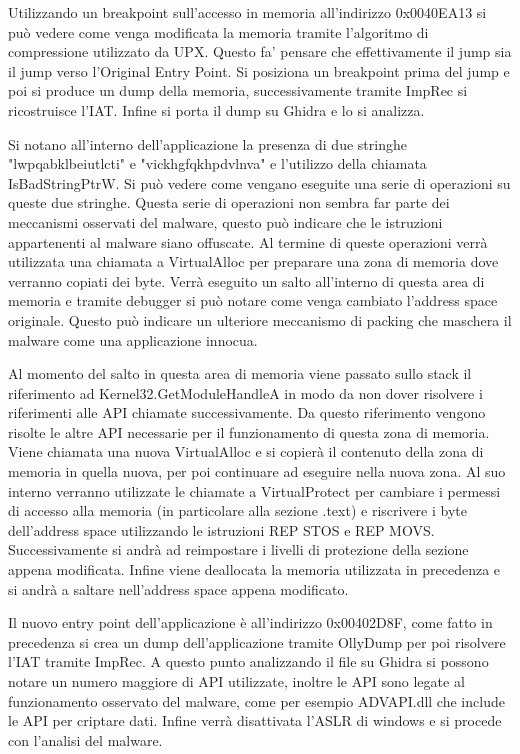 \documentclass[a4paper,12pt]{article}
\begin{document}
Utilizzando un breakpoint sull'accesso in memoria all'indirizzo 0x0040EA13 si può vedere come venga modificata la memoria tramite l'algoritmo di compressione utilizzato da UPX. Questo fa' pensare che effettivamente il jump sia il jump verso l'Original Entry Point. Si posiziona un breakpoint prima del jump e poi si produce un dump della memoria, successivamente tramite ImpRec si ricostruisce l'IAT.
Infine si porta il dump su Ghidra e lo si analizza.

Si notano all'interno dell'applicazione la presenza di due stringhe "lwpqabklbeiutlcti" e "vickhgfqkhpdvlnva" e l'utilizzo della chiamata IsBadStringPtrW. Si può vedere come vengano eseguite una serie di operazioni su queste due stringhe. Questa serie di operazioni non sembra far parte dei meccanismi osservati del malware, questo può indicare che le istruzioni appartenenti al malware siano offuscate. 
Al termine di queste operazioni verrà utilizzata una chiamata a VirtualAlloc per preparare una zona di memoria dove verranno copiati dei byte.  Verrà eseguito un salto all'interno di questa area di memoria e tramite debugger si può notare come venga cambiato l'address space originale. Questo può indicare un ulteriore meccanismo di packing che maschera il malware come una applicazione innocua.

Al momento del salto in questa area di memoria viene passato sullo stack il riferimento ad Kernel32.GetModuleHandleA in modo da non dover risolvere i riferimenti alle API chiamate successivamente. Da questo riferimento vengono risolte le altre API necessarie per il funzionamento di questa zona di memoria. Viene chiamata una nuova VirtualAlloc e si copierà il contenuto della zona di memoria in quella nuova, per poi continuare ad eseguire nella nuova zona. Al suo interno verranno utilizzate le chiamate a VirtualProtect per cambiare i permessi di accesso alla memoria (in particolare alla sezione .text) e riscrivere i byte dell'address space utilizzando le istruzioni REP STOS e REP MOVS. Successivamente si andrà ad reimpostare i livelli di protezione della sezione appena modificata. Infine viene deallocata la memoria utilizzata in precedenza e si andrà a saltare nell'address space appena modificato.

Il nuovo entry point dell'applicazione è all'indirizzo 0x00402D8F, come fatto in precedenza si crea un dump dell'applicazione tramite OllyDump per poi risolvere l'IAT tramite ImpRec. A questo punto analizzando il file su Ghidra si possono notare un numero maggiore di API utilizzate, inoltre le API sono legate al funzionamento osservato del malware, come per esempio ADVAPI.dll che include le API per criptare dati. Infine verrà disattivata l'ASLR di windows e si procede con l'analisi del malware. 
\end{document}
